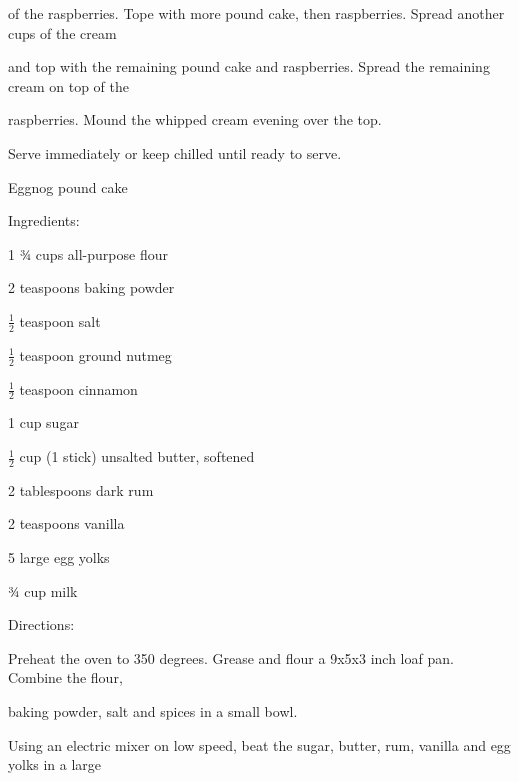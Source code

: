 \documentclass[a4paper,portrait,12pt]{book}
\begin{document}
of the raspberries. Tope with more pound cake, then raspberries. Spread another cups of the cream






and top with the remaining pound cake and raspberries. Spread the remaining cream on top of the




raspberries. Mound the whipped cream evening over the top.




Serve immediately or keep chilled until ready to serve.







\newpage
Eggnog pound cake




Ingredients:




1 ¾ cups all-purpose flour




2 teaspoons baking powder




$\frac{1}{2}$ teaspoon salt




$\frac{1}{2}$ teaspoon ground nutmeg




$\frac{1}{2}$ teaspoon cinnamon




1 cup sugar




$\frac{1}{2}$ cup (1 stick) unsalted butter, softened




2 tablespoons dark rum




2 teaspoons vanilla




5 large egg yolks




¾ cup milk




Directions:




Preheat the oven to 350 degrees. Grease and flour a 9x5x3 inch loaf pan. Combine the flour,




baking powder, salt and spices in a small bowl.




Using an electric mixer on low speed, beat the sugar, butter, rum, vanilla and egg yolks in a large
\end{document}
